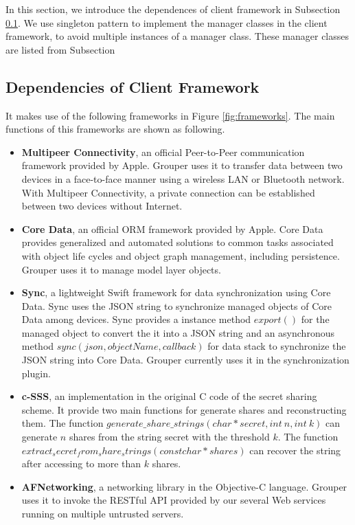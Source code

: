 \documentclass[a4paper,11pt]{report}
\begin{document}
In this section, we introduce the dependences of client framework in Subsection \ref{subsection:dependencies_client}.
We use singleton pattern to implement the manager classes in the client framework, to avoid multiple instances of a manager class.
These manager classes are listed from Subsection 

\subsection{Dependencies of Client Framework} \label{subsection:dependencies_client}

It makes use of the following frameworks in Figure \ref{fig:frameworks}.
The main functions of this frameworks are shown as following.

\begin{itemize}[leftmargin=7mm]
	\setlength{\itemsep}{1pt}
	\setlength{\parskip}{0pt}
	\setlength{\parsep}{0pt}
	\item 
	\textbf{Multipeer Connectivity}\cite{mc}, an official Peer-to-Peer communication framework provided by Apple. 
	Grouper uses it to transfer data between two devices in a face-to-face manner using a wireless LAN or Bluetooth network.
	With Multipeer Connectivity, a private connection can be established between two devices without Internet.
	\item 
	\textbf{Core Data}\cite{coredata}, an official ORM framework provided by Apple.
	Core Data provides generalized and automated solutions to common tasks associated with object life cycles and object graph management, including persistence. 
	Grouper uses it to manage model layer objects. 
	\item 
	\textbf{Sync}\cite{sync}, a lightweight Swift framework for data synchronization using Core Data.
	Sync uses the JSON string to synchronize managed objects of Core Data among devices.
	Sync provides a instance method $export()$ for the managed object to convert the it into a JSON string and an asynchronous method $sync(json, objectName, callback)$ for data stack to synchronize the JSON string into Core Data.
	Grouper currently uses it in the synchronization plugin.
	\item 
	\textbf{c-SSS}\cite{c-sss}, an implementation in the original C code of the secret sharing scheme. 
	It provide two main functions for generate shares and reconstructing them. The function $generate\_share\_strings(char * secret, int\ n, int\ k)$ can generate $n$ shares from the string secret with the threshold $k$. The function $extract_secret_from_share_strings(const char * shares)$ can recover the string after accessing to more than $k$ shares.
	\item 
	\textbf{AFNetworking}\cite{afnetworking}, a networking library in the Objective-C language. 
	Grouper uses it to invoke the RESTful API provided by our several Web services running on multiple untrusted servers. 
\end{itemize}
\end{document}
